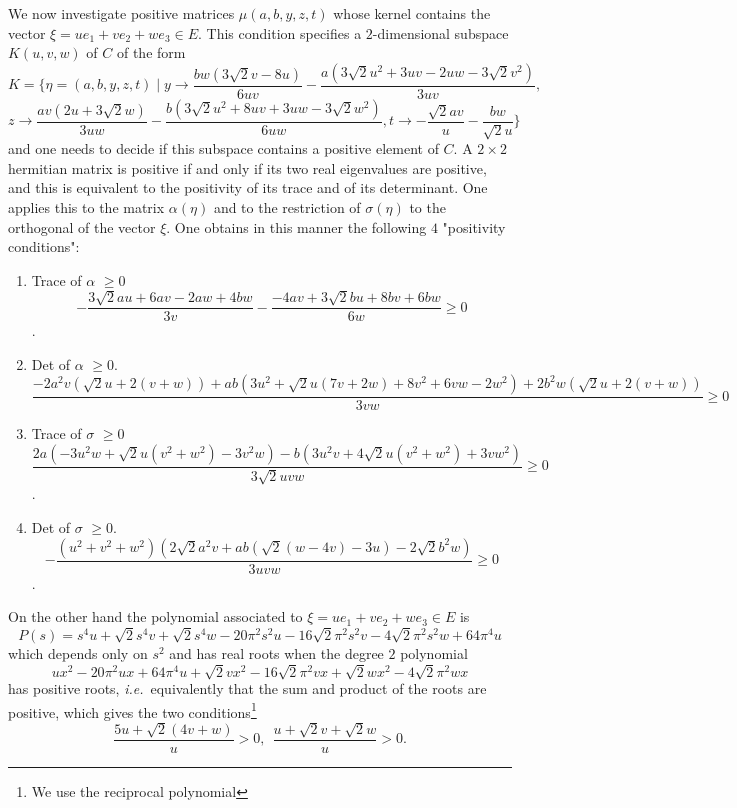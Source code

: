\documentclass{amsart}
\newcommand{\ie}{{\it i.e.\/}\ }
\begin{document}
We now investigate positive matrices $\mu(a,b,y,z,t)$ whose kernel contains the vector $\xi=u e_1+v e_2+w e_3\in E$.
This condition specifies a $2$-dimensional subspace $K(u,v,w)$ of $C$ of the form
$$
K=\{\eta=(a,b,y,z,t)\mid y\to \frac{b w \left(3 \sqrt{2} v-8 u\right)}{6 u v}-\frac{a \left(3 \sqrt{2} u^2+3 u v-2 u w-3 \sqrt{2} v^2\right)}{3 u v},$$ $$
z\to \frac{a v \left(2 u+3 \sqrt{2} w\right)}{3 u w}-\frac{b \left(3 \sqrt{2} u^2+8 u v+3 u w-3 \sqrt{2} w^2\right)}{6 u w},t\to -\frac{\sqrt{2} a v}{u}-\frac{b w}{\sqrt{2} u}\}
$$
and one needs to decide if this subspace contains a positive element of $C$. A $2\times 2$ hermitian matrix is positive if and only if its two real eigenvalues are positive, and this is equivalent to the positivity of its trace and of its determinant. One applies this to the matrix $\alpha(\eta)$ and to the restriction of $\sigma(\eta)$ to the orthogonal of the vector $\xi$. One obtains in this manner the following $4$ "positivity conditions":
\begin{enumerate}
	\item Trace of $\alpha$ $\geq 0$ $$-\frac{3 \sqrt{2} a u+6 a v-2 a w+4 b w}{3 v}-\frac{-4 a v+3 \sqrt{2} b u+8 b v+6 b w}{6 w}\geq 0$$.
	\item Det  of $\alpha$ $\geq 0$.
	 $$\frac{-2 a^2 v \left(\sqrt{2} u+2 (v+w)\right)+a b \left(3 u^2+\sqrt{2} u (7 v+2 w)+8 v^2+6 v w-2 w^2\right)+2 b^2 w \left(\sqrt{2} u+2 (v+w)\right)}{3 v w}\geq 0$$
	\item Trace of $\sigma$ $\geq 0$ $$\frac{2 a \left(-3 u^2 w+\sqrt{2} u \left(v^2+w^2\right)-3 v^2 w\right)-b \left(3 u^2 v+4 \sqrt{2} u \left(v^2+w^2\right)+3 v w^2\right)}{3 \sqrt{2} u v w}\geq 0$$.
	\item Det of $\sigma$ $\geq 0$. $$-\frac{ \left(u^2+v^2+w^2\right) \left(2 \sqrt{2} a^2 v+a b \left(\sqrt{2} (w-4 v)-3 u\right)-2 \sqrt{2} b^2 w\right)}{3 u v w}\geq 0$$.
\end{enumerate}
On the other hand the polynomial associated to  $\xi=u e_1+v e_2+w e_3\in E$ is 
$$
P(s)=s^4 u+\sqrt{2} s^4 v+\sqrt{2} s^4 w-20 \pi ^2 s^2 u-16 \sqrt{2} \pi ^2 s^2 v-4 \sqrt{2} \pi ^2 s^2 w+64 \pi ^4 u
$$
which depends only on $s^2$ and has real roots when the degree $2$ polynomial 
$$
u x^2-20 \pi ^2 u x+64 \pi ^4 u+\sqrt{2} v x^2-16 \sqrt{2} \pi ^2 v x+\sqrt{2} w x^2-4 \sqrt{2} \pi ^2 w x
$$
has positive roots, \ie equivalently that the sum and product of the roots are positive,
which gives the two conditions\footnote{We use the reciprocal polynomial} 
\begin{equation}\label{realroopol}
\frac{5 u+\sqrt{2} (4 v+w)}{ u}>0, \ \ \frac{u+\sqrt{2} v+\sqrt{2} w}{ u}>0	.
\end{equation}
\end{document}
